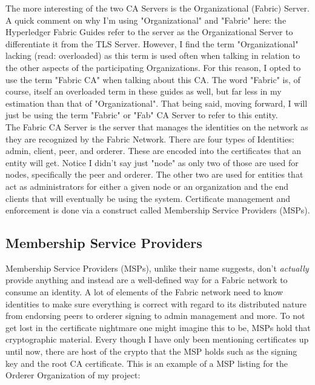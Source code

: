 		\hspace{10mm}The more interesting of the two CA Servers is the Organizational (Fabric) Server. A quick comment on why I'm using "Organizational" and "Fabric" here: the Hyperledger Fabric Guides refer to the server as the Organizational Server to differentiate it from the TLS Server. However, I find the term "Organizational" lacking (read: overloaded) as this term is used often when talking in relation to the other aspects of the participating Organizations. For this reason, I opted to use the term "Fabric CA" when talking about this CA. The word "Fabric" is, of course, itself an overloaded term in these guides as well, but far less in my estimation than that of "Organizational". That being said, moving forward, I will just be using the term "Fabric" or "Fab" CA Server to refer to this entity.\\
		
		\hspace{10mm}The Fabric CA Server is the server that manages the identities on the network as they are recognized by the Fabric Network. There are four types of Identities: admin, client, peer, and orderer. These are encoded into the certificates that an entity will get. Notice I didn't say just "node" as only two of those are used for nodes, specifically the peer and orderer. The other two are used for entities that act as administrators for either a given node or an organization and the end clients that will eventually be using the system. Certificate management and enforcement is done via a construct called Membership Service Providers (MSPs).\\
		
	\subsection{Membership Service Providers}
		\hspace{10mm}Membership Service Providers (MSPs), unlike their name suggests, don't \textit{actually} provide anything and instead are a well-defined way for a Fabric network to consume an identity. A lot of elements of the Fabric network need to know identities to make sure everything is correct with regard to its distributed nature from endorsing peers to orderer signing to admin management and more. To not get lost in the certificate nightmare one might imagine this to be, MSPs hold that cryptographic material. Every though I have only been mentioning certificates up until now, there are host of the crypto that the MSP holds such as the signing key and the root CA certificate. This is an example of a MSP listing for the Orderer Organization of my project:
		
